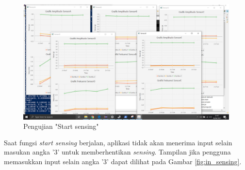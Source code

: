 \begin{itemize}
    \begin{figure}[H] 
    	\centering  
    	\includegraphics[scale=0.24]{Gambar/Hasil Sensing/fungsional2.png}
    	\caption[Pengujian "Start sensing"]{Pengujian "Start sensing"}
    	\label{fig:start_sensing} 
    \end{figure}
    
    Saat fungsi \textit{start sensing} berjalan, aplikasi tidak akan menerima input selain masukan angka '3' untuk memberhentikan \textit{sensing}. Tampilan jika pengguna memasukkan input selain angka '3' dapat dilihat pada Gambar \ref{fig:in_sensing}.
    

\end{itemize}
